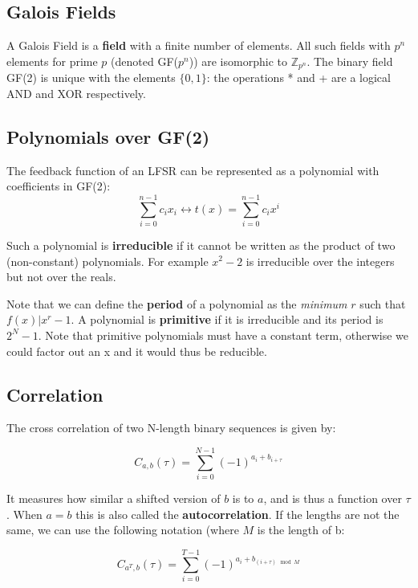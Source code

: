 \documentclass[11pt]{report}
\begin{document}
\subsection{Galois Fields}
A Galois Field is a \textbf{field} with a finite number of elements. All such fields with $p^n$ elements for prime $p$ (denoted GF($p^n$)) are isomorphic to $\mathbb{Z}_{p^n}$. The binary field GF(2) is unique with the elements $\{0, 1\}$: the operations * and + are a logical AND and XOR respectively.

\subsection{Polynomials over GF(2)}
The feedback function of an LFSR can be represented as a polynomial with coefficients in GF(2):
\begin{equation}
	\sum_{i=0}^{n-1}c_ix_i \leftrightarrow t(x) = \sum_{i=0}^{n-1}c_ix^i
\end{equation}

Such a polynomial is \textbf{irreducible} if it cannot be written as the product of two (non-constant) polynomials. For example $x^2-2$ is irreducible over the integers but not over the reals.

Note that we can define the \textbf{period} of a polynomial as the \textit{minimum} $r$ such that $f(x) | x^r-1$. A polynomial is \textbf{primitive} if it is irreducible and its period is $2^N-1$.
Note that primitive polynomials must have a constant term, otherwise we could factor out an x and it would thus be reducible.

\subsection{Correlation}
The cross correlation of two N-length binary sequences is given by:

\begin{equation}
	C_{a, b}(\tau) = \sum_{i=0}^{N-1} (-1)^{a_i + b_{i+\tau}}
\end{equation}

It measures how similar a shifted version of $b$ is to $a$, and is thus a function over $\tau$. When $a=b$ this is also called the \textbf{autocorrelation}. If the lengths are not the same, we can use the following notation (where $M$ is the length of b:

\begin{equation}
	\label{eqn:general-cross-correlation}
	C_{a^T,b}(\tau) = \sum_{i=0}^{T-1}(-1)^{a_i + b_{(i + \tau) \mod M}}
\end{equation}
\end{document}
